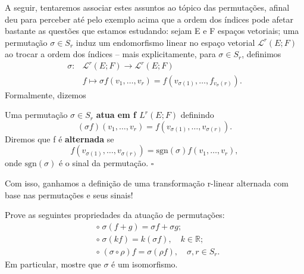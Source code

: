 \documentclass[../differential_forms.tex]{subfiles}
\begin{document}
A seguir, tentaremos associar estes assuntos ao tópico das permutações, afinal deu para perceber até pelo exemplo acima que a ordem dos índices pode afetar bastante as questões que estamos estudando: sejam E e F espaços vetoriais; uma permutação \(\sigma \in S_r\) induz um endomorfismo linear no espaço vetorial \(\mathcal{L}^{r}(E; F)\) ao trocar a ordem dos índices -- mais explicitamente, para \(\sigma \in S_r\), definimos
\begin{align*}
	\sigma : & \mathcal{L}^{r}(E; F)\rightarrow\mathcal{L}^{r}(E; F)                                    \\
	         & f\longmapsto \sigma f(v_1, \dotsc , v_r) = f(v_{\sigma (1)}, \dotsc , f_{v_\sigma (r)}).
\end{align*}
Formalmente, dizemos
\begin{def*}
	Uma permutação \(\sigma \in S_r\) \textbf{atua em f \(L^{r}(E; F)\)} definindo
	\[
		(\sigma f)(v_1,\dotsc ,v_r) = f(v_{\sigma (1)}, \dotsc , v_{\sigma (r)}).
	\]
	Diremos que f é \textbf{alternada} se
	\[
		f(v_{\sigma (1)},\dotsc , v_{\sigma (r)})= \mathrm{sgn}(\sigma )f(v_1,\dotsc ,v_r),
	\]
	onde \(\mathrm{sgn}(\sigma )\) é o sinal da permutação. \(\square\)
\end{def*}
Com isso, ganhamos a definição de uma transformação r-linear alternada com base nas permutações e seus sinais!
\begin{exr}
	Prove as seguintes propriedades da atuação de permutações:
	\begin{align*}
		 & \circ \;\sigma (f+g) = \sigma f + \sigma g;                               \\
		 & \circ \; \sigma ( k f) =  k (\sigma f), \quad k\in \mathbb{R};            \\
		 & \circ \; (\sigma \circ \rho )f = \sigma (\rho f), \quad \sigma ,r\in S_r.
	\end{align*}
	Em particular, mostre que \(\sigma \) é um isomorfismo.
\end{exr}
\end{document}
